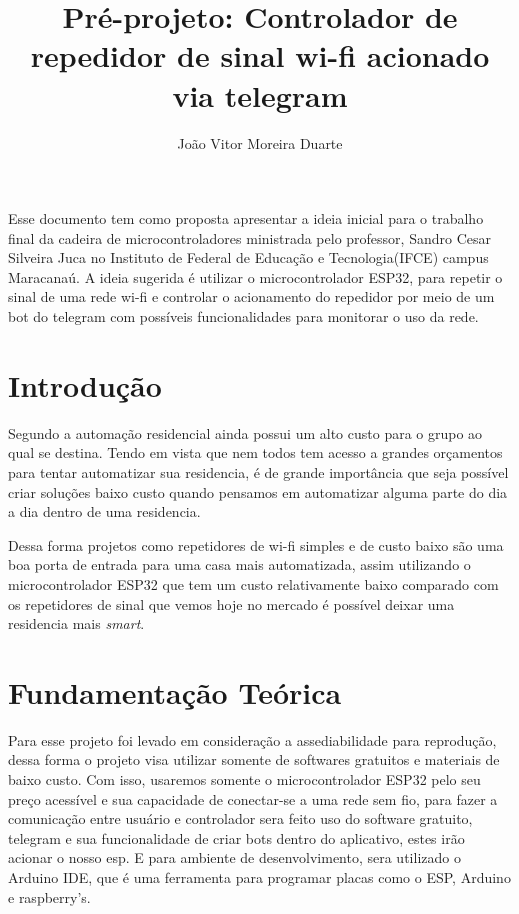 \documentclass[12pt]{article}
\title{Pré-projeto: Controlador de repedidor de sinal wi-fi acionado via telegram}
\author{João Vitor Moreira Duarte }
\begin{document}
\maketitle
\begin{resumo}
  Esse documento tem como proposta apresentar a ideia inicial para o trabalho final da cadeira de microcontroladores
  ministrada pelo professor, Sandro Cesar Silveira Juca no Instituto de Federal de Educação e Tecnologia(IFCE) campus Maracanaú.
  A ideia sugerida é utilizar o microcontrolador ESP32, para repetir o sinal de uma rede wi-fi e controlar o acionamento
  do repedidor por meio de um bot do telegram com possíveis funcionalidades para monitorar o uso da rede.
\end{resumo}


\section{Introdução}
Segundo \cite{ALMEIDA} a automação residencial ainda possui um alto custo para o
grupo ao qual se destina. Tendo em vista que nem todos tem acesso a grandes orçamentos para tentar automatizar sua residencia,
é de grande importância que seja possível criar soluções baixo custo quando pensamos em automatizar alguma parte do dia a dia dentro de uma residencia.

Dessa forma projetos como repetidores de wi-fi simples e de custo baixo são uma boa porta de entrada para uma casa mais automatizada,
assim utilizando o microcontrolador ESP32 que tem um custo relativamente baixo comparado com os repetidores de sinal que vemos hoje no mercado
é possível deixar uma residencia mais \emph{smart}.

\section{Fundamentação Teórica}
Para esse projeto foi levado em consideração a assediabilidade para reprodução, dessa forma o projeto visa utilizar somente de softwares gratuitos e materiais de baixo custo.
Com isso, usaremos somente o microcontrolador ESP32 pelo seu preço acessível e sua capacidade de conectar-se a uma rede sem fio, para fazer a comunicação entre usuário e
controlador sera feito uso do software gratuito, telegram e sua funcionalidade de criar bots dentro do aplicativo, estes irão acionar o nosso esp. E para ambiente de desenvolvimento,
sera utilizado o Arduino IDE, que é uma ferramenta para programar placas como o ESP, Arduino e raspberry's.
\end{document}
